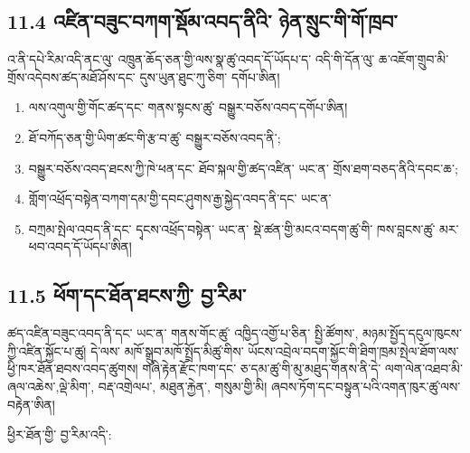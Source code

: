 \documentclass[11pt]{article}
\begin{document}
\subsection*{11.4 འཛིན་བཟུང་བཀག་སྡོམ་འབད་ནིའི་ ཉེན་སྲུང་གི་གོ་ཁྲབ་}

འ་ནི་དཔེ་རིམ་འདི་ནང་ལུ་ འཁྲུན་ཆོད་ཅན་གྱི་ལས་སྣ་ཚུ་འབད་དོ་ཡོདཔ་ད་ འདི་གི་དོན་ལུ་ ཆ་འཇོག་གྲུབ་མི་ གྲོས་འདེབས་ཚད་མཐོ་ཤོས་དང་ དུས་ཡུན་ཐུང་ཀུ་ཅིག་ དགོཔ་ཨིན།

\begin{enumerate}[leftmargin=*]
\item ལས་འགུལ་གྱི་གོང་ཚད་དང་ གནས་སྟངས་ཚུ་ བསྒྱུར་བཅོས་འབད་དགོཔ་ཨིན།
\item ཐོ་བཀོད་ཅན་གྱི་ཡིག་ཚང་གི་རྩ་བ་ཚུ་ བསྒྱུར་བཅོས་འབད་ནི་;
\item བསྒྱུར་བཅོས་འབད་ཐངས་ཀྱི་ཁེ་ཕན་དང་ ཐོབ་སྐལ་གྱི་ཚད་འཛིན་ ཡང་ན་ གྲོས་ཐག་བཅད་ནིའི་དབང་ཆ་;
\item གློག་འཕྲོད་བསྟེན་བཀག་དམ་གྱི་དབང་ཤུགས་རྒྱ་སྐྱེད་འབད་ནི་དང་ ཡང་ན་
\item བཀྲམ་སྤེལ་འབད་ནི་དང་ དྭངས་འཕྲོད་བསྟེན་ ཡང་ན་ སྡེ་ཚན་གྱི་མངའ་བདག་ཚུ་གི་ ཁས་བླངས་ཚུ་ མར་ཕབ་འབད་དོ་ཡོདཔ་ཨིན།
\end{enumerate}
\subsection*{11.5 ཕོག་དང་ཐོན་ཐངས་ཀྱི་ བྱ་རིམ་}

ཚད་འཛིན་བཟུང་འབད་ནི་དང་ ཡང་ན་ གནས་གོང་ཚུ་ འཁྱིད་འགྱོ་པ་ཅིན་ སྤྱི་ཚོགས་, མཉམ་སྤྱོད་དངུལ་ཁུངས་ཀྱི་འཛིན་སྐྱོང་པ་ཚུ། དེ་ལས་ མཁོ་སྒྲུབ་མཁོ་སྤྲོད་མིཚུ་གིས་ ཡོངས་འབྲེལ་བདག་སྐྱོང་གི་ཐིག་ཁྲམ་སྤེལ་ཐོག་ལས་ ཕྱི་ཁར་ཐོན་ཐབས་འབད་ཚུགས། གཞི་རྟེན་རྫོང་ཁག་དང་ ཅ་དམ་ཚུ་གི་མུ་མཐུད་གནས་ནི་དེ་ ལག་ལེན་འཐབ་མི་ཞལ་འཆེས་,ལྡེ་མིག་, བརྡ་འགྲེལཔ་, མཐུན་རྐྱེན་, གསུམ་གྱི་མི། ཞབས་ཏོག་དང་བསྟུན་པའི་འགན་ཁུར་ཚུ་ལས་བརྟེན་ཨིན།

ཕྱིར་ཐོན་གྱི་ བྱ་རིམ་འདི་:
\end{document}
